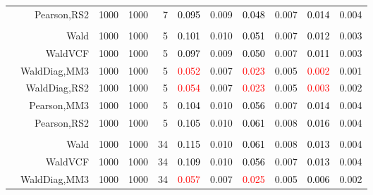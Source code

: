 \documentclass[
]{article}
\begin{document}
\begin{table}[H]
{\begin{tabular}[t]{lrrrrrrrlrr}
\hspace{1em} & Pearson,RS2 & 1000 & 1000 & 7 & \textcolor{black}{0.095} & 0.009 & \textcolor{black}{0.048} & 0.007 & \textcolor{black}{0.014} & 0.004\\
\cmidrule{1-11}
\addlinespace[0.3em]
\multicolumn{11}{l}{\textbf{2F 10V}}\\
\hspace{1em} & Wald & 1000 & 1000 & 5 & \textcolor{black}{0.101} & 0.010 & \textcolor{black}{0.051} & 0.007 & \textcolor{black}{0.012} & 0.003\\

\hspace{1em} & WaldVCF & 1000 & 1000 & 5 & \textcolor{black}{0.097} & 0.009 & \textcolor{black}{0.050} & 0.007 & \textcolor{black}{0.011} & 0.003\\

\hspace{1em} & WaldDiag,MM3 & 1000 & 1000 & 5 & \textcolor{red}{0.052} & 0.007 & \textcolor{red}{0.023} & 0.005 & \textcolor{red}{0.002} & 0.001\\

\hspace{1em} & WaldDiag,RS2 & 1000 & 1000 & 5 & \textcolor{red}{0.054} & 0.007 & \textcolor{red}{0.023} & 0.005 & \textcolor{red}{0.003} & 0.002\\

\hspace{1em} & Pearson,MM3 & 1000 & 1000 & 5 & \textcolor{black}{0.104} & 0.010 & \textcolor{black}{0.056} & 0.007 & \textcolor{black}{0.014} & 0.004\\

\hspace{1em} & Pearson,RS2 & 1000 & 1000 & 5 & \textcolor{black}{0.105} & 0.010 & \textcolor{black}{0.061} & 0.008 & \textcolor{black}{0.016} & 0.004\\
\cmidrule{1-11}
\addlinespace[0.3em]
\multicolumn{11}{l}{\textbf{3F 15V}}\\
\hspace{1em} & Wald & 1000 & 1000 & 34 & \textcolor{black}{0.115} & 0.010 & \textcolor{black}{0.061} & 0.008 & \textcolor{black}{0.013} & 0.004\\

\hspace{1em} & WaldVCF & 1000 & 1000 & 34 & \textcolor{black}{0.109} & 0.010 & \textcolor{black}{0.056} & 0.007 & \textcolor{black}{0.013} & 0.004\\

\hspace{1em} & WaldDiag,MM3 & 1000 & 1000 & 34 & \textcolor{red}{0.057} & 0.007 & \textcolor{red}{0.025} & 0.005 & \textcolor{black}{0.006} & 0.002\\


\end{tabular}}
\end{table}
\end{document}
